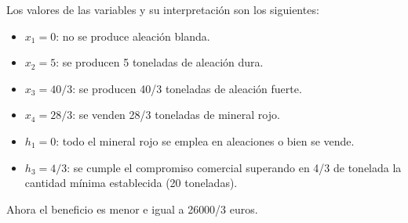 \begin{enumerate}
Los valores de las variables y su interpretación son los siguientes:
\begin{itemize}
    \item $x_1 = 0$: no se produce aleación blanda. 
    \item $x_2 = 5$: se producen 5 toneladas de aleación dura.
    \item $x_3 = 40/3$: se producen 40/3 toneladas de aleación fuerte.
    \item $x_4 = 28/3$: se venden 28/3 toneladas de mineral rojo.
    \item $h_1 = 0$: todo el mineral rojo se emplea en aleaciones o bien se vende.
    \item $h_3 = 4/3$: se cumple el compromiso comercial superando en 4/3 de tonelada la cantidad mínima establecida (20 toneladas).
\end{itemize}
    
Ahora el beneficio es menor e igual a 26000/3 euros.

\end{enumerate}